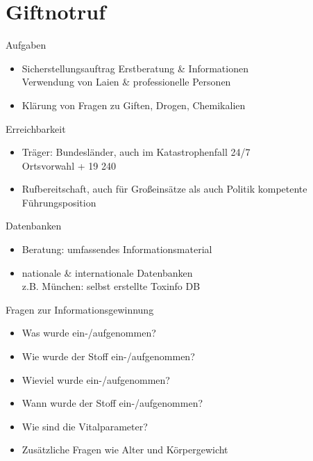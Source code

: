 \section{Giftnotruf}
\begin{sectionbox}{Aufgaben}
    \begin{itemize}
        \item Sicherstellungsauftrag Erstberatung \& Informationen\\
        \ra Verwendung von Laien \& professionelle Personen
        \item Klärung von Fragen zu Giften, Drogen, Chemikalien
    \end{itemize}
\end{sectionbox}
\begin{sectionbox}{Erreichbarkeit}
    \begin{itemize}
        \item Träger: Bundesländer, auch im Katastrophenfall 24/7\\
        \ra Ortsvorwahl + 19 240
        \item Rufbereitschaft, auch für Großeinsätze als auch Politik
        \ra kompetente Führungsposition
    \end{itemize}
\end{sectionbox}
\begin{sectionbox}{Datenbanken}
    \begin{itemize}
        \item Beratung: umfassendes Informationsmaterial
        \item nationale \& internationale Datenbanken\\
        \ra z.B. München: selbst erstellte Toxinfo DB 
    \end{itemize}
\end{sectionbox}
\begin{warningbox}{Fragen zur Informationsgewinnung}
    \begin{itemize}
        \item Was wurde ein-/aufgenommen?
        \item Wie wurde der Stoff ein-/aufgenommen?
        \item Wieviel wurde ein-/aufgenommen?
        \item Wann wurde der Stoff ein-/aufgenommen?
        \item Wie sind die Vitalparameter?
        \item Zusätzliche Fragen wie Alter und Körpergewicht
    \end{itemize}
\end{warningbox}